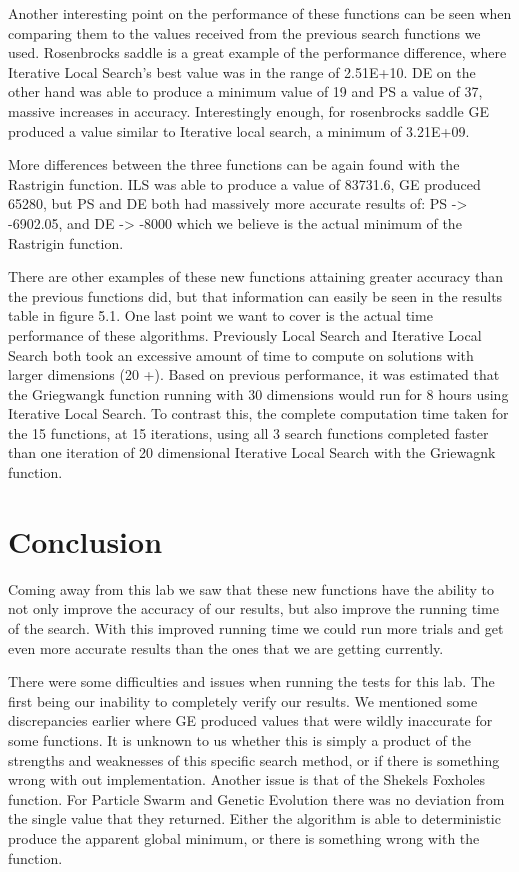 \documentclass[paper=a4, fontsize=11pt]{scrartcl}
\numberwithin{equation}{section}
\numberwithin{figure}{section}
\numberwithin{table}{section}
\begin{document}
Another interesting point on the performance of these functions can be seen when comparing
them to the values received from the previous search functions we used. Rosenbrocks saddle
is a great example of the performance difference, where Iterative Local Search's best
value was in the range of 2.51E+10. DE on the other hand was able to produce a minimum
value of 19 and PS a value of 37, massive increases in accuracy. Interestingly enough,
for rosenbrocks saddle GE produced a value similar to Iterative local search, a minimum
of 3.21E+09.

More differences between the three functions can be again found with the Rastrigin function.
ILS was able to produce a value of 83731.6, GE produced 65280, but PS and DE both had
massively more accurate results of: PS -> -6902.05, and DE -> -8000 which we believe is the
actual minimum of the Rastrigin function.

There are other examples of these new functions attaining greater accuracy than the previous
functions did, but that information can easily be seen in the results table in figure 5.1. One last point we
want to cover is the actual time performance of these algorithms. Previously Local Search and
Iterative Local Search both took an excessive amount of time to compute on solutions with
larger dimensions (20 +). Based on previous performance, it was estimated that the Griegwangk
function running with 30 dimensions would run for 8 hours using Iterative Local Search. To contrast
this, the complete computation time taken for the 15 functions, at 15 iterations, using all 3
search functions completed faster than one iteration of 20 dimensional Iterative Local Search
with the Griewagnk function.

\section{Conclusion}

Coming away from this lab we saw that these new functions have the ability to not only
improve the accuracy of our results, but also improve the running time of the search.
With this improved running time we could run more trials and get even more accurate results
than the ones that we are getting currently.

There were some difficulties and issues when running the tests for this lab. The first being
our inability to completely verify our results. We mentioned some discrepancies earlier
where GE produced values that were wildly inaccurate for some functions. It is unknown to
us whether this is simply a product of the strengths and weaknesses of this specific search
method, or if there is something wrong with out implementation. Another issue is that of the
Shekels Foxholes function. For Particle Swarm and Genetic Evolution there was no deviation from
the single value that they returned. Either the algorithm is able to deterministic
produce the apparent global minimum, or there is something wrong with the function.
\end{document}
